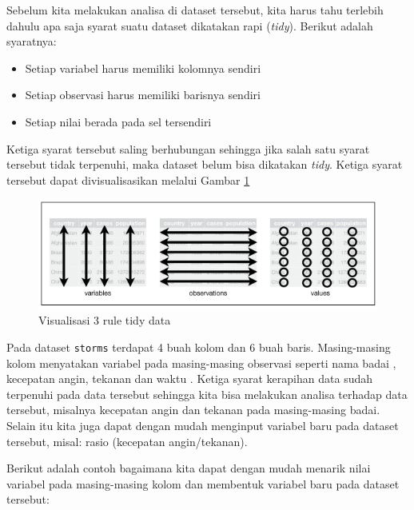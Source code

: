 \documentclass[]{book}
\newenvironment{Shaded}{\begin{snugshade}}{\end{snugshade}}
\newcommand{\CommentTok}[1]{\textcolor[rgb]{0.56,0.35,0.01}{\textit{#1}}}
\newcommand{\OperatorTok}[1]{\textcolor[rgb]{0.81,0.36,0.00}{\textbf{#1}}}
\newcommand{\NormalTok}[1]{#1}
\providecommand{\tightlist}{%
  \setlength{\itemsep}{0pt}\setlength{\parskip}{0pt}}
\begin{document}
Sebelum kita melakukan analisa di dataset tersebut, kita harus tahu
terlebih dahulu apa saja syarat suatu dataset dikatakan rapi
(\emph{tidy}). Berikut adalah syaratnya:

\begin{itemize}
\tightlist
\item
  Setiap variabel harus memiliki kolomnya sendiri
\item
  Setiap observasi harus memiliki barisnya sendiri
\item
  Setiap nilai berada pada sel tersendiri
\end{itemize}

Ketiga syarat tersebut saling berhubungan sehingga jika salah satu
syarat tersebut tidak terpenuhi, maka dataset belum bisa dikatakan
\emph{tidy}. Ketiga syarat tersebut dapat divisualisasikan melalui
Gambar \ref{fig:tidy}

\begin{figure}

{\centering \includegraphics[width=8.14in]{tidy} 

}

\caption{Visualisasi 3 rule tidy data}\label{fig:tidy}
\end{figure}

Pada dataset \texttt{storms} terdapat 4 buah kolom dan 6 buah baris.
Masing-masing kolom menyatakan variabel pada masing-masing observasi
seperti nama badai , kecepatan angin, tekanan dan waktu . Ketiga syarat
kerapihan data sudah terpenuhi pada data tersebut sehingga kita bisa
melakukan analisa terhadap data tersebut, misalnya kecepatan angin dan
tekanan pada masing-masing badai. Selain itu kita juga dapat dengan
mudah menginput variabel baru pada dataset tersebut, misal: rasio
(kecepatan angin/tekanan).

Berikut adalah contoh bagaimana kita dapat dengan mudah menarik nilai
variabel pada masing-masing kolom dan membentuk variabel baru pada
dataset tersebut:

\begin{Shaded}
\end{Shaded}
\end{document}

